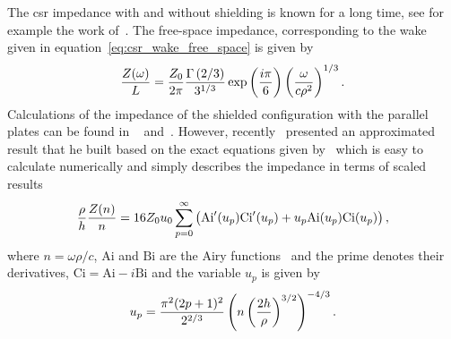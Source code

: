     The \gls{csr} impedance with and without shielding is known for a long time, see for example the work of~. The free-space impedance, corresponding to the wake given in equation~\eqref{eq:csr_wake_free_space} is given by~\cite[Eq. 18]{Nagaoka2014}
    \begin{align}\label{eq:csr_imp_free_space}
        \frac{Z(\omega)}{L} = \frac{Z_0}{2\pi}
                            \frac{\Gamma\left(2/3\right)}{3^{1/3}}
                            \exp\left(\frac{i\pi}{6}\right)
                            \left(\frac{\omega}{c\rho^2}\right)^{1/3}.
    \end{align}
    Calculations of the impedance of the shielded configuration with the parallel plates can be found in ~ and~. However, recently~ presented an approximated result that he built based on the exact equations given by~ which is easy to calculate numerically and simply describes the impedance in terms of scaled results
    \def \Ai {\text{Ai}}
    \def \Bi {\text{Bi}}
    \def \Ci {\text{Ci}}
    \begin{align}\label{eq:csr_imp_shielding}
        \frac{\rho}{h} \frac{Z(n)}{n} = 16 Z_0 u_0
                        \sum_{p=0}^\infty \fof{\Ai'(u_p)\Ci'(u_p) +
                                            u_p\Ai(u_p)\Ci(u_p)},
    \end{align}
    where $n=\omega\rho/c$, $\Ai$ and $\Bi$ are the Airy functions~\cite{wiki2017c} and the prime denotes their derivatives, $\Ci = \Ai - i\Bi$ and the variable $u_p$ is given by
    \begin{align}
        u_p = \frac{\pi^2(2p+1)^2}{2^{2/3}}\left(n\left(\frac{2h}{\rho}\right)^{3/2}\right)^{-4/3}.
    \end{align}

